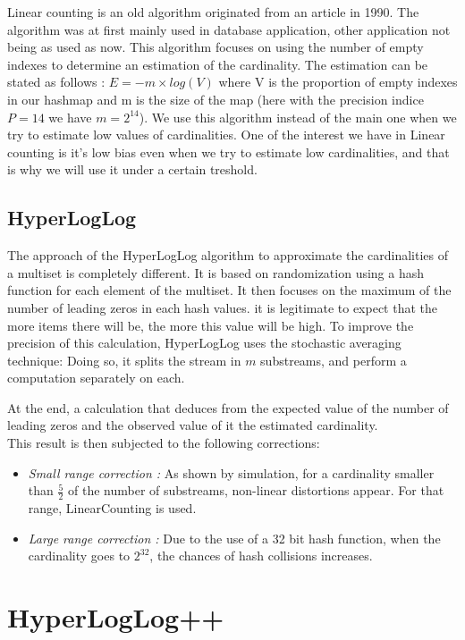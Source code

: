 \documentclass{article}
\begin{document}
Linear counting is an old algorithm originated from an article in
1990. The algorithm was at first mainly used in database application,
other application not being as used as now. This algorithm focuses on
using the number of empty indexes to determine an estimation of the
cardinality. The estimation can be stated as follows : $E = -m\times
log(V)$ where V is the proportion of empty indexes in our hashmap and
m is the size of the map (here with the precision indice $P=14$ we
have $m=2^{14}$).  We use this algorithm instead of the main one when
we try to estimate low values of cardinalities. One of the interest we
have in Linear counting is it's low bias even when we try to estimate
low cardinalities, and that is why we will use it under a certain
treshold.

\subsection{HyperLogLog}
The approach of the HyperLogLog algorithm to approximate the
cardinalities of a multiset is completely different. It is based on
randomization using a hash function for each element of the
multiset. It then focuses on the maximum of the number of leading
zeros in each hash values. it is legitimate to expect that the more
items there will be, the more this value will be high.  To improve the
precision of this calculation, HyperLogLog uses the stochastic
averaging technique: Doing so, it splits the stream in $m$ substreams,
and perform a computation separately on each.

At the end, a calculation that deduces from the expected value of the
number of leading zeros and the observed value of it the estimated
cardinality.\\
This result is then subjected to the following corrections:
\begin{itemize}
\item \emph{Small range correction :} As shown by simulation, for a
cardinality smaller than $\frac{5}{2}$ of the number of substreams, non-linear
distortions appear. For that range, LinearCounting is used.
\item \emph{Large range correction :} Due to the use of a 32 bit hash
function, when the cardinality goes to $2^{32}$, the chances of hash
collisions increases.
\end{itemize}

\section{HyperLogLog++}
\end{document}
